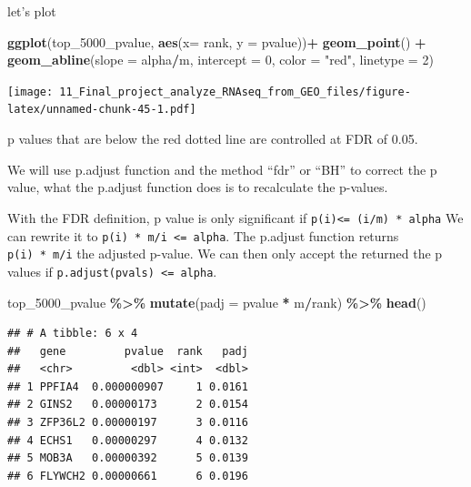 \documentclass[
]{book}
\newenvironment{Shaded}{\begin{snugshade}}{\end{snugshade}}
\newcommand{\AttributeTok}[1]{\textcolor[rgb]{0.13,0.29,0.53}{#1}}
\newcommand{\DecValTok}[1]{\textcolor[rgb]{0.00,0.00,0.81}{#1}}
\newcommand{\FunctionTok}[1]{\textcolor[rgb]{0.13,0.29,0.53}{\textbf{#1}}}
\newcommand{\NormalTok}[1]{#1}
\newcommand{\SpecialCharTok}[1]{\textcolor[rgb]{0.81,0.36,0.00}{\textbf{#1}}}
\newcommand{\StringTok}[1]{\textcolor[rgb]{0.31,0.60,0.02}{#1}}
\begin{document}
let's plot

\begin{Shaded}
\begin{Highlighting}[]
\FunctionTok{ggplot}\NormalTok{(top\_5000\_pvalue, }\FunctionTok{aes}\NormalTok{(}\AttributeTok{x=}\NormalTok{ rank, }\AttributeTok{y =}\NormalTok{ pvalue))}\SpecialCharTok{+}
  \FunctionTok{geom\_point}\NormalTok{() }\SpecialCharTok{+} 
  \FunctionTok{geom\_abline}\NormalTok{(}\AttributeTok{slope =}\NormalTok{ alpha}\SpecialCharTok{/}\NormalTok{m, }\AttributeTok{intercept =} \DecValTok{0}\NormalTok{, }\AttributeTok{color =} \StringTok{"red"}\NormalTok{, }\AttributeTok{linetype =} \DecValTok{2}\NormalTok{) }
\end{Highlighting}
\end{Shaded}

\texttt{[image: 11\_Final\_project\_analyze\_RNAseq\_from\_GEO\_files/figure-latex/unnamed-chunk-45-1.pdf]}

p values that are below the red dotted line are controlled at FDR of 0.05.

We will use p.adjust function and the method ``fdr'' or ``BH'' to correct the p value, what the p.adjust function does is to recalculate the p-values.

With the FDR definition, p value is only significant if \texttt{p(i)\textless{}=\ (i/m)\ *\ alpha} We can rewrite it to \texttt{p(i)\ *\ m/i\ \textless{}=\ alpha}. The p.adjust function returns \texttt{p(i)\ *\ m/i} the adjusted p-value. We can then only accept the returned the p values if \texttt{p.adjust(pvals)\ \textless{}=\ alpha}.

\begin{Shaded}
\begin{Highlighting}[]
\NormalTok{top\_5000\_pvalue }\SpecialCharTok{\%\textgreater{}\%}
  \FunctionTok{mutate}\NormalTok{(}\AttributeTok{padj =}\NormalTok{ pvalue }\SpecialCharTok{*}\NormalTok{ m}\SpecialCharTok{/}\NormalTok{rank) }\SpecialCharTok{\%\textgreater{}\%}
  \FunctionTok{head}\NormalTok{()}
\end{Highlighting}
\end{Shaded}

\begin{verbatim}
## # A tibble: 6 x 4
##   gene         pvalue  rank   padj
##   <chr>         <dbl> <int>  <dbl>
## 1 PPFIA4  0.000000907     1 0.0161
## 2 GINS2   0.00000173      2 0.0154
## 3 ZFP36L2 0.00000197      3 0.0116
## 4 ECHS1   0.00000297      4 0.0132
## 5 MOB3A   0.00000392      5 0.0139
## 6 FLYWCH2 0.00000661      6 0.0196
\end{verbatim}
\end{document}
